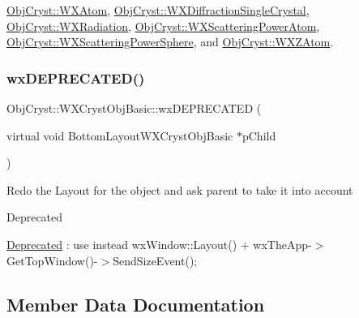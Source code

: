 \mbox{\hyperlink{class_obj_cryst_1_1_w_x_atom_a09c1212622fe6bb17ca8443455370551}{Obj\+Cryst\+::\+W\+X\+Atom}}, \mbox{\hyperlink{class_obj_cryst_1_1_w_x_diffraction_single_crystal_a2b8ef5fa0663d1526258a17498e9b0fc}{Obj\+Cryst\+::\+W\+X\+Diffraction\+Single\+Crystal}}, \mbox{\hyperlink{class_obj_cryst_1_1_w_x_radiation_abb1a51ad74c6072019e28bdc19085ecb}{Obj\+Cryst\+::\+W\+X\+Radiation}}, \mbox{\hyperlink{class_obj_cryst_1_1_w_x_scattering_power_atom_abd8a32f23a0b29e45ae32e40f0fec212}{Obj\+Cryst\+::\+W\+X\+Scattering\+Power\+Atom}}, \mbox{\hyperlink{class_obj_cryst_1_1_w_x_scattering_power_sphere_a2e1eed3ea3e179e57621251cc844be3e}{Obj\+Cryst\+::\+W\+X\+Scattering\+Power\+Sphere}}, and \mbox{\hyperlink{class_obj_cryst_1_1_w_x_z_atom_ad98ce4a82eb861cb2fafbddb7ab9bfbe}{Obj\+Cryst\+::\+W\+X\+Z\+Atom}}.

\mbox{\label{class_obj_cryst_1_1_w_x_cryst_obj_basic_a4c3fd7a3493369a505725843ef05ac02}} 
\subsubsection{\texorpdfstring{wxDEPRECATED()}{wxDEPRECATED()}}
{\footnotesize\ttfamily Obj\+Cryst\+::\+W\+X\+Cryst\+Obj\+Basic\+::wx\+D\+E\+P\+R\+E\+C\+A\+T\+ED (\begin{DoxyParamCaption}\item[{virtual void }]{Bottom\+LayoutW\+X\+Cryst\+Obj\+Basic $\ast$p\+Child }\end{DoxyParamCaption})}

Redo the Layout for the object and ask parent to take it into account

\begin{DoxyRefDesc}{Deprecated}
\item[\mbox{\hyperlink{deprecated__deprecated000001}{Deprecated}}]\+: use instead wx\+Window\+::\+Layout() + wx\+The\+App-\/$>$Get\+Top\+Window()-\/$>$Send\+Size\+Event(); \end{DoxyRefDesc}


\subsection{Member Data Documentation}
\mbox{\label{class_obj_cryst_1_1_w_x_cryst_obj_basic_acdf122c5232f3902d342afdc95e56bc2}} 

